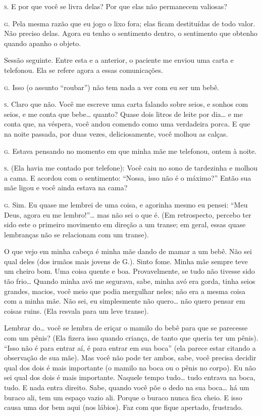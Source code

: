 \noindent\hskip0mm\textsc{s.} E por que você se livra delas? Por que elas não permanecem valiosas?

\noindent\hskip0mm\textsc{g.} Pela mesma razão que eu jogo o lixo fora; elas ficam destituídas de
todo valor. Não preciso delas. Agora eu tenho o sentimento dentro, o
sentimento que obtenho quando apanho o objeto.

\bigskip

Sessão seguinte. Entre esta e a anterior, o paciente me enviou uma
carta e telefonou. Ela se refere agora a essas comunicações.

\bigskip

\noindent\hskip0mm\textsc{g.} Isso (o assunto ``roubar'') não tem nada a
ver com eu ser um bebê.

\noindent\hskip0mm\textsc{s.} Claro que não. Você me escreve uma carta falando sobre seios, e
sonhos com seios, e me conta que bebe\ldots{} quanto? Quase dois litros de
leite por dia\ldots{} e me conta que, na véspera, você andou comendo como
uma verdadeira porca. E que na noite passada, por duas vezes,
deliciosamente, você molhou as calças.

\noindent\hskip0mm\textsc{g.} Estava pensando no momento em que minha mãe me telefonou, ontem à
noite.

\noindent\hskip0mm\textsc{s.} (Ela havia me contado por telefone): Você caiu no sono de tardezinha
e molhou a cama. E acordou com o sentimento: ``Nossa, isso
não é o máximo?'' Então sua mãe ligou e você ainda estava
na cama?

\noindent\hskip0mm\textsc{g.} Sim. Eu quase me lembrei de uma coisa, e agorinha mesmo eu pensei:
``Meu Deus, agora eu me lembro!''\ldots{} mas não
sei o que é. (Em retrospecto, percebo ter sido este o primeiro
movimento em direção a um transe; em geral, essas quase lembranças não
se relacionam com um transe).

O que vejo em minha cabeça é minha mãe dando de mamar a um bebê. Não
sei qual deles (dos irmãos mais jovens de G.). Sinto fome. Minha mãe
sempre teve um cheiro bom. Uma coisa quente e boa. Provavelmente, se
tudo não tivesse sido tão frio\ldots{} Quando minha avó me segurava, sabe,
minha avó era gorda, tinha seios grandes, macios, você meio que podia
mergulhar neles; não era a mesma coisa com a minha mãe. Não sei, eu
simplesmente não quero\ldots{} não quero pensar em coisas ruins. (Ela
resvala para um leve transe).

Lembrar do\ldots{} você se lembra de eriçar o mamilo do bebê para que se
parecesse com um pênis? (Ela fizera isso quando criança, de tanto que
queria ter um pênis). ``Isso não é para entrar aí, é para
entrar em sua boca'' (ela parece estar citando a
observação de sua mãe). Mas você não pode ter ambos, sabe, você precisa
decidir qual dos dois é mais importante (o mamilo na boca ou o pênis no
corpo). Eu não sei qual dos dois é mais importante. Naquele tempo
tudo\ldots{} tudo entrava na boca, tudo. E nada entra direito. Sabe, quando
você põe o dedo na sua boca\ldots{} há um buraco ali, tem um espaço vazio
ali. Porque o buraco nunca fica cheio. E isso causa uma dor bem aqui
(nos lábios). Faz com que fique apertado, frustrado.

